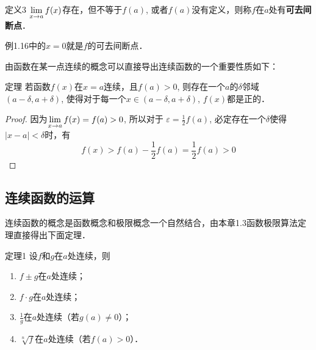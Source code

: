 \begin{blk}
    {定义3} $\displaystyle\lim_{x\to a}f(x)$存在，但不等于$f(a)$, 或者$f(a)$没有定义，则称$f$在$a$处有\textbf{可去间断点}．
\end{blk}

例1.16中的$x=0$就是$f$的可去间断点．

由函数在某一点连续的概念可以直接导出连续函数的一个重要性质如下：

\begin{blk}
{定理} 若函数$f(x)$在$x=a$连续，且$f(a)>0$, 则存在一个$a$的$\delta$邻域$(a-\delta,a+\delta)$, 使得对于每一个$x\in (a-\delta,a+\delta)$, $f(x)$都是正的．    
\end{blk}

\begin{proof}
    因为$\displaystyle\lim_{x\to a} f(x)=f(a)>0$, 所以对于
$\varepsilon=\frac{1}{2}f(a)$, 必定存在一个$\delta$使得$|x-a|<\delta$时，有
\[f (x) > f (a) -\frac{1}{2}f (a) =\frac{1}{2}f (a) > 0\]
\end{proof}

\subsection{连续函数的运算}
连续函数的概念是函数概念和极限概念一个自然结合，由本章1.3函数极限算法定理直接得出下面定理．

\begin{blk}
 {定理1} 设$f$和$g$在$a$处连续，则
 \begin{enumerate}
     \item $f\pm g$在$a$处连续；
     \item $f\cdot g$在$a$处连续；
     \item $\frac{1}{g}$在$a$处连续（若$g(a)\ne 0$）；
     \item $\sqrt[n]{f}$在$a$处连续（若$f(a)>0$）．
 \end{enumerate}
\end{blk}

